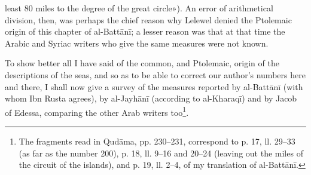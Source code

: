 \documentclass[11pt]{article}
\begin{document}
least 80 miles to the degree of the great circle»). An error of arithmetical division, then, was perhaps the chief reason why Lelewel denied the Ptolemaic origin of this chapter of al-Battānī; a lesser reason was that at that time the Arabic and Syriac writers who give the same measures were not known.\par
\par To show better all I have said of the common, and Ptolemaic, origin of the descriptions of the seas, and so as to be able to correct our author's numbers here and there, I shall now give a survey of the measures reported by al-Battānī (with whom Ibn Rusta agrees), by al-Jayhānī (according to al-Kharaqī) and by Jacob of Edessa, comparing the other Arab writers too\footnote{The fragments read in Qudāma, pp. 230–231, correspond to p. 17, ll. 29–33 (as far as the number 200), p. 18, ll. 9–16 and 20–24 (leaving out the miles of the circuit of the islands), and p. 19, ll. 2–4, of my translation of al-Battānī.}.\par
\end{document}
